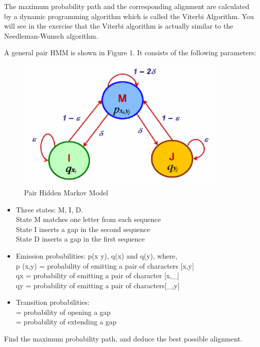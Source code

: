 \documentclass[a4paper,11pt]{article}
\DeclareRobustCommand{\greektext}{%
  \fontencoding{LGR}\selectfont\def\encodingdefault{LGR}}
\DeclareRobustCommand{\textgreek}[1]{\leavevmode{\greektext #1}}
\begin{document}
The maximum probability path and the corresponding alignment are calculated by a dynamic
programming algorithm which is called the Viterbi Algorithm. You will
see in the exercise that the Viterbi algorithm is actually similar
to the Needleman-Wunsch algorithm.

A general pair HMM is shown in Figure 1. It consists of the following parameters:
\begin{figure}[h]
\begin{centering}
\includegraphics[width=4in]{HMMfigures.eps}\caption{Pair Hidden Markov Model}
\par\end{centering}
\end{figure}

\begin{itemize}
\item Three states: M, I, D.\\
State M matches one letter from each sequence\\
State I inserts a gap in the second sequence \\
State D inserts a gap in the first sequence

\item Emission probabilities: p(x y), q(x) and q(y), where,\\
p (x,y) = probability of emitting a pair of characters {[}x,y{]} \\
qx = probability of emitting a pair of character {[}x,\_{]}\\
qy = probability of emitting a pair of characters{[}\_,y{]}

\item Transition probabilities:\\
\textgreek{d} = probability of opening a gap \\
\textgreek{e} = probability of extending a gap \\
\end{itemize}

Find the maximum probability path, and deduce the best possible alignment.
\end{document}
